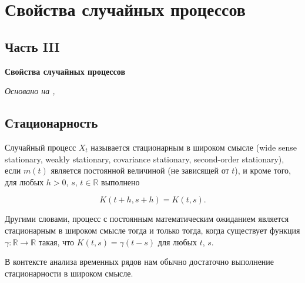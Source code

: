 \chapter{Свойства случайных процессов}
\section*{Часть III} \textbf{Свойства случайных процессов}

\textit{Основано на \cite{adeshereKorrelyaciyaMezhduVremennymi2021},
\cite{panovTeoriyaSluchaynyhProcessov2018}}

\section{Стационарность}
 {
  Случайный процесс \( X_t \) называется
  стационарным в широком смысле (wide sense stationary,
    weakly stationary, covariance stationary,
  second-order stationary), если $m(t)$ является постоянной величиной
  (не зависящей от $t$), и кроме того, для любых $h > 0$, $s$, $t \in
  \mathbb{R}$ выполнено

\[ K(t + h, s + h) = K(t, s). \] }

Другими словами, процесс с постоянным математическим ожиданием
является стационарным в широком смысле тогда и только тогда, когда
существует функция $ \gamma : \mathbb{R} \to \mathbb{R} $ такая, что $
K(t, s) = \gamma(t-s) $ для любых $t$, $s$.

В контексте анализа временных рядов
нам обычно достаточно выполнение стационарности в широком смысле.

